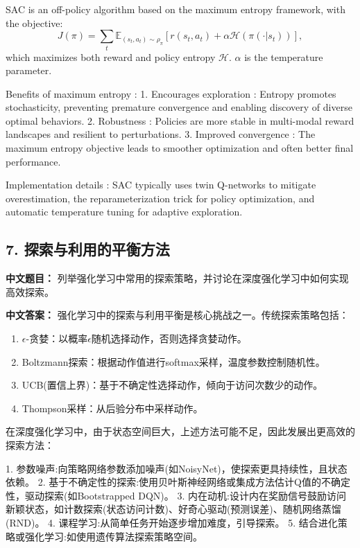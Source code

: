 \documentclass[10pt,a4paper]{ctexart}
\begin{document}
 SAC  is an off-policy algorithm based on the maximum entropy framework, with the objective:
\[
J(\pi) = \sum_t \mathbb{E}_{(s_t,a_t)\sim\rho_\pi} \left[ r(s_t,a_t) + \alpha \mathcal{H}(\pi(\cdot|s_t)) \right],
\]  
which maximizes both reward and policy entropy \(\mathcal{H}\). \(\alpha\) is the temperature parameter.

 Benefits of maximum entropy :
1.  Encourages exploration : Entropy promotes stochasticity, preventing premature convergence and enabling discovery of diverse optimal behaviors.
2.  Robustness : Policies are more stable in multi-modal reward landscapes and resilient to perturbations.
3.  Improved convergence : The maximum entropy objective leads to smoother optimization and often better final performance.

 Implementation details : SAC typically uses twin Q-networks to mitigate overestimation, the reparameterization trick for policy optimization, and automatic temperature tuning for adaptive exploration.

\subsection*{7. 探索与利用的平衡方法}
\textbf{中文题目：} 列举强化学习中常用的探索策略，并讨论在深度强化学习中如何实现高效探索。

\textbf{中文答案：}  
强化学习中的探索与利用平衡是核心挑战之一。传统探索策略包括：
\begin{enumerate}
    \item \(\epsilon\)-贪婪：以概率\(\epsilon\)随机选择动作，否则选择贪婪动作。
    \item Boltzmann探索：根据动作值进行softmax采样，温度参数控制随机性。
    \item UCB(置信上界)：基于不确定性选择动作，倾向于访问次数少的动作。
    \item Thompson采样：从后验分布中采样动作。
\end{enumerate}

在深度强化学习中，由于状态空间巨大，上述方法可能不足，因此发展出更高效的探索方法：

1.  参数噪声:向策略网络参数添加噪声(如NoisyNet)，使探索更具持续性，且状态依赖。
2.  基于不确定性的探索:使用贝叶斯神经网络或集成方法估计Q值的不确定性，驱动探索(如Bootstrapped DQN)。
3.  内在动机:设计内在奖励信号鼓励访问新颖状态，如计数探索(状态访问计数)、好奇心驱动(预测误差)、随机网络蒸馏(RND)。
4.  课程学习:从简单任务开始逐步增加难度，引导探索。
5.  结合进化策略或强化学习:如使用遗传算法探索策略空间。
\end{document}
